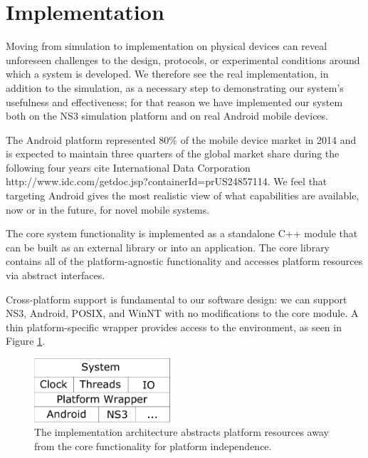 \documentclass[10pt,twocolumn]{article}
\begin{document}
\section{Implementation}

Moving from simulation to implementation on physical devices can reveal unforeseen challenges to the design, protocols, or experimental conditions around which a system is developed. We therefore see the real implementation, in addition to the simulation, as a necessary step to demonstrating our system's usefulness and effectiveness; for that reason we have implemented our system both on the NS3 simulation platform and on real Android mobile devices.

The Android platform represented 80\% of the mobile device market in 2014 and is expected to maintain three quarters of the global market share during the following four years cite International Data Corporation http://www.idc.com/getdoc.jsp?containerId=prUS24857114. We feel that targeting Android gives the most realistic view of what capabilities are available, now or in the future, for novel mobile systems.

The core system functionality is implemented as a standalone C++ module that can be built as an external library or into an application. The core library contains all of the platform-agnostic functionality and accesses platform resources via abstract interfaces.

Cross-platform support is fundamental to our software design: we can support NS3, Android, POSIX, and WinNT with no modifications to the core module. A thin platform-specific wrapper provides access to the environment, as seen in Figure \ref{fig:android-platform-wrapper}.

\begin{figure}[!b]
  \begin{center}
    \includegraphics[width=0.45\textwidth]{android-platform-wrapper.pdf}
  \end{center}

  \caption{\small The implementation architecture abstracts platform resources away from the core functionality for platform independence.}
  \label{fig:android-platform-wrapper}
\end{figure}
\end{document}
